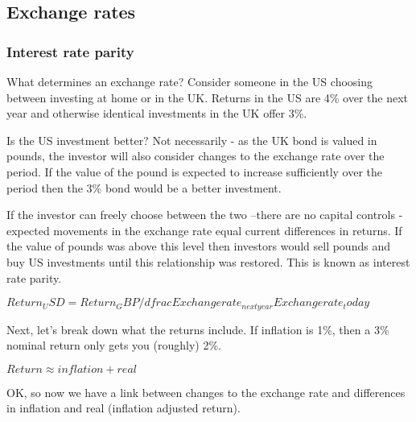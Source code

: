 
\subsection{Exchange rates}

\subsubsection{Interest rate parity}

What determines an exchange rate? Consider someone in the US choosing between investing at home or in the UK. Returns in the US are 4\% over the next year and otherwise identical investments in the UK offer 3\%.

Is the US investment better? Not necessarily - as the UK bond is valued in pounds, the investor will also consider changes to the exchange rate over the period. If the value of the pound is expected to increase sufficiently over the period then the 3\% bond would be a better investment.

If the investor can freely choose between the two –there are no capital controls - expected movements in the exchange rate equal current differences in returns. If the value of pounds was above this level then investors would sell pounds and buy US investments until this relationship was restored. This is known as interest rate parity.

\(Return_USD = Return_GBP /dfrac{Exchange rate_{next year}}{Exchange rate_today}\)

Next, let’s break down what the returns include. If inflation is 1\%, then a 3\% nominal return only gets you (roughly) 2\%.

\(Return \approx inflation + real\)

OK, so now we have a link between changes to the exchange rate and differences in inflation and real (inflation adjusted return).

